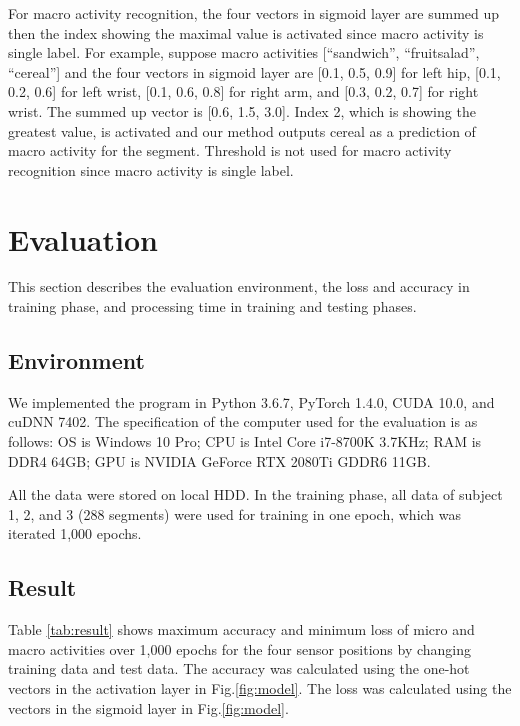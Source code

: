 \documentclass{svmult}
\begin{document}
For macro activity recognition, the four vectors in sigmoid layer are summed up then the index showing the maximal value is activated since macro activity is single label. For example, suppose macro activities [``sandwich'', ``fruitsalad'', ``cereal''] and the four vectors in sigmoid layer are [0.1, 0.5, 0.9] for left hip, [0.1, 0.2, 0.6] for left wrist, [0.1, 0.6, 0.8] for right arm, and [0.3, 0.2, 0.7] for right wrist. The summed up vector is [0.6, 1.5, 3.0]. Index 2, which is showing the greatest value, is activated and our method outputs cereal as a prediction of macro activity for the segment. Threshold is not used for macro activity recognition since macro activity is single label.

\section{Evaluation}
\label{sec:evaluation}
This section describes the evaluation environment, the loss and accuracy in training phase, and processing time in training and testing phases.

\subsection{Environment}
We implemented the program in Python 3.6.7, PyTorch 1.4.0, CUDA 10.0, and cuDNN 7402. The specification of the computer used for the evaluation is as follows: OS is Windows 10 Pro; CPU is Intel Core i7-8700K 3.7KHz; RAM is DDR4 64GB; GPU is NVIDIA GeForce RTX 2080Ti GDDR6 11GB.

All the data were stored on local HDD. In the training phase, all data of subject 1, 2, and 3 (288 segments) were used for training in one epoch, which was iterated 1,000 epochs.

\subsection{Result}
Table \ref{tab:result} shows maximum accuracy and minimum loss of micro and macro activities over 1,000 epochs for the four sensor positions by changing training data and test data. The accuracy was calculated using the one-hot vectors in the activation layer in Fig.\ref{fig:model}. The loss was calculated using the vectors in the sigmoid layer in Fig.\ref{fig:model}. 
\end{document}
